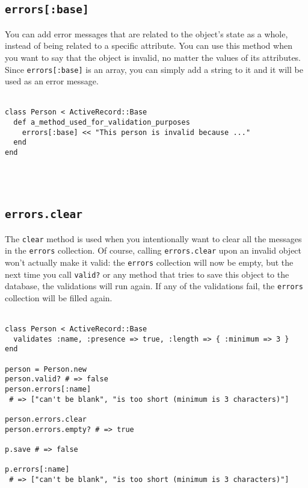 \documentclass[10pt]{book}
\begin{document}
\subsection{ \texttt{errors[:base]}}

You can add error messages that are related to the object’s state as a  whole, instead of being related to a specific attribute. You can use  this method when you want to say that the object is invalid, no matter  the values of its attributes. Since \texttt{errors[:base]} is an array, you can simply add a string to it and it will be used as an error message.
\\ \\
\begin{minipage}{\textwidth}{\scriptsize
\begin{verbatim}
class Person < ActiveRecord::Base
  def a_method_used_for_validation_purposes
    errors[:base] << "This person is invalid because ..."
  end
end
\end{verbatim}}
\end{minipage}
\\ \\

\subsection{ \texttt{errors.clear}}

The \texttt{clear} method is used when you intentionally want to clear all the messages in the \texttt{errors} collection. Of course, calling \texttt{errors.clear} upon an invalid object won’t actually make it valid: the \texttt{errors} collection will now be empty, but the next time you call \texttt{valid?}  or any method that tries to save this object to the database, the  validations will run again. If any of the validations fail, the \texttt{errors} collection will be filled again.
\\ \\
\begin{minipage}{\textwidth}{\scriptsize
\begin{verbatim}
class Person < ActiveRecord::Base
  validates :name, :presence => true, :length => { :minimum => 3 }
end
 
person = Person.new
person.valid? # => false
person.errors[:name]
 # => ["can't be blank", "is too short (minimum is 3 characters)"]
 
person.errors.clear
person.errors.empty? # => true
 
p.save # => false
 
p.errors[:name]
 # => ["can't be blank", "is too short (minimum is 3 characters)"]
\end{verbatim}}
\end{minipage}
\\ \\
\end{document}
